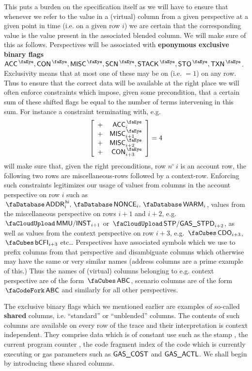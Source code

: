 This puts a burden on the specification itself as we will have to ensure that whenever we refer to the value in a (virtual) column from a given perspective at a given point in time (i.e. on a given row $i$) we are certain that the corresponding value is the value present in the associated blended column.
We will make sure of this as follows.
Perspectives will be associated with \textbf{eponymous exclusive binary flags} $\peekAccount, \peekContext, \peekMisc, \peekScenario, \peekStack, \peekStorage, \peekTransaction$.
Exclusivity means that at most one of these may be on (i.e. $=1$) on any row.
Thus to ensure that the correct data will be available at the right place we will often enforce constraints which impose, given some precondition, that a certain sum of these shifted flags be equal to the number of terms intervening in this sum. For instance a constraint terminating with, e.g.
\[
	\left[ \begin{array}{cr}
		+ & \peekAccount_{i} \\
		+ & \peekMisc   _{i + 1} \\
		+ & \peekMisc   _{i + 2} \\
		+ & \peekContext_{i + 3} \\
	\end{array} \right]
	=
	4
\]
will make sure that, given the right preconditions, row $n^\circ~i$ is an account row, the following two rows are miscellaneous-rows followed by a context-row.
Enforcing such constraints legitimizes our usage of values from columns in the account perspective on row $i$ such as $\accAddressHi_{i}, \accNonce_{i}, \accWarmth_{i}$,
values from the miscellaneous perspective on rows $i + 1$ and $i + 2$, e.g. $\miscMmuInst_{i + 1}$ or $\miscStpGasStipend_{i + 2}$,
as well as values from the context perspective on row $i + 3$, e.g. $\cnCdo_{i + 3}$, $\cnCodeCfi_{i + 3}$ etc\dots{}
\saNote{} Perspectives have associated symbols which we use to prefix columns from that perspective and disambiguate columns which otherwise may have the same or very similar names (address columns are a prime example of this.)
Thus the names of (virtual) columns belonging to e.g. context perspective are of the form $\contextSignifier\col{ABC}$, scenario columns are of the form $\scenarioSignifier\col{ABC}$ and similarly for all other perspectives.

The exclusive binary flags which we mentioned earlier are examples of so-called \textbf{shared} columns, i.e. ``standard'' or ``unblended'' columns.
The contents of such columns are available on every row of the trace and their interpretation is context independent.
They comprise data which is of constant use such as the \hubMod{} stamp \hubStamp{}, the current program counter \pc{}, the code fragment index \cfi{} of the code which is currently executing or gas parameters such as $\textsf{GAS}\textsf{\_COST}$ and $\textsf{GAS}\textsf{\_ACTL}$.
We shall begin by introducing these shared columns.

